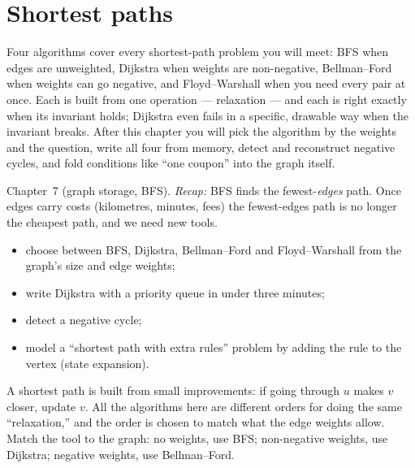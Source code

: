 \chapter{Shortest paths}\label{ch:sp}

Four algorithms cover every shortest-path problem you will meet:
BFS when edges are unweighted, Dijkstra when weights are
non-negative, Bellman--Ford when weights can go negative, and
Floyd--Warshall when you need every pair at once. Each is built from
one operation --- relaxation --- and each is right exactly when its
invariant holds; Dijkstra even fails in a specific, drawable way when
the invariant breaks. After this chapter you will pick the algorithm
by the weights and the question, write all four from memory, detect
and reconstruct negative cycles, and fold conditions like ``one
coupon'' into the graph itself.

\begin{rulebox}
Chapter~7 (graph storage, BFS). \emph{Recap:} BFS finds the fewest-\emph{edges} path. Once edges carry costs (kilometres, minutes, fees) the fewest-edges path is no longer the cheapest path, and we need new tools.
\end{rulebox}
\begin{wins}
\begin{itemize}
\item choose between BFS, Dijkstra, Bellman--Ford and Floyd--Warshall from the graph's size and edge weights;
\item write Dijkstra with a priority queue in under three minutes;
\item detect a negative cycle;
\item model a ``shortest path with extra rules'' problem by adding the rule to the vertex (state expansion).
\end{itemize}
\end{wins}
\begin{principle}
A shortest path is built from small improvements: if going through $u$ makes $v$ closer, update $v$. All the algorithms here are different orders for doing the same ``relaxation,'' and the order is chosen to match what the edge weights allow. Match the tool to the graph: no weights, use BFS; non-negative weights, use Dijkstra; negative weights, use Bellman--Ford.
\end{principle}

